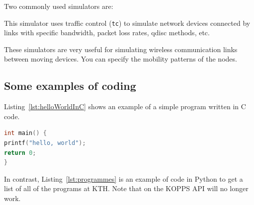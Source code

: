 Two commonly used simulators are:
\begin{description}[labelwidth =\widthof{\textbf{ns-2 or ns-3 simulator}}, leftmargin = !]
    \item[\textbf{Mininet}] This simulator uses traffic control (\texttt{tc}) to simulate network devices connected by links with specific bandwidth, packet loss rates, qdisc methods, etc.
    
    
    \item[\textbf{ns-2 or ns-3 simulator}] These simulators are very useful for simulating wireless communication links between moving devices. You can specify the mobility patterns of the nodes.
\end{description}

\subsection{Some examples of coding}

Listing~\ref{lst:helloWorldInC} shows an example of a simple program written
in C code.

\begin{lstlisting}[language={C}, caption={Hello world in C code}, label=lst:helloWorldInC]
int main() {
printf("hello, world");
return 0;
}
\end{lstlisting}


In contrast, Listing~\ref{lst:programmes} is an example of code in Python to
get a list of all of the programs at KTH. Note that on {} the KOPPS API will no longer work.


